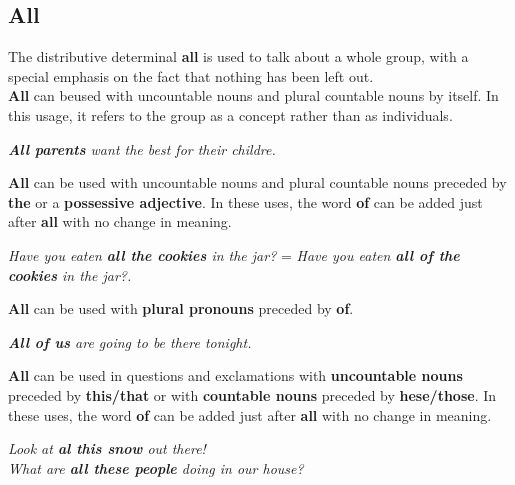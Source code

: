 \documentclass[hidelinks,10pt,a4paper]{article}
\begin{document}
\subsection{All}
The distributive determinal \textbf{all} is used to talk about a whole group, with a special emphasis on the fact that nothing has been left out.\\
\indent \textbf{All} can beused with uncountable nouns and plural countable nouns by itself. In this usage, it refers to the group as a concept rather than as individuals.
\begin{center}
\textit{ \textbf{All parents} want the best for their childre.}
\end{center}
\textbf{All} can be used with uncountable nouns and plural countable nouns preceded by \textbf{the} or a \textbf{possessive adjective}. In these uses, the word \textbf{of} can be added just after \textbf{all} with no change in meaning.
\begin{center}
\textit{ Have you eaten \textbf{all the cookies} in the jar?} = \textit{Have you eaten \textbf{all of the cookies} in the jar?.}
\end{center}
\textbf{All} can be used with \textbf{plural pronouns} preceded by \textbf{of}.
\begin{center}
\textit{ \textbf{All of us} are going to be there tonight.}
\end{center}
\textbf{All} can be used in questions and exclamations with \textbf{uncountable nouns} preceded by \textbf{this/that} or with \textbf{countable nouns} preceded by \textbf{hese/those}.  In these uses, the word \textbf{of} can be added just after \textbf{all} with no change in meaning.
\begin{center}
\textit{ Look at \textbf{al this snow} out there!\\
What are \textbf{all these people} doing in our house?}
\end{center}
\end{document}
